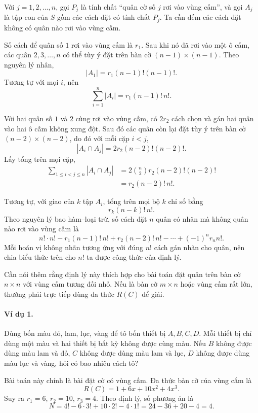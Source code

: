 \documentclass[11pt]{article}
\begin{document}
Với $j=1,2,\ldots,n$, gọi $P_j$ là tính chất ``quân cờ số $j$ rơi vào vùng
cấm'', và gọi $A_j$ là tập con của $S$ gồm các cách đặt có tính chất $P_j$.
Ta cần đếm các cách đặt không có quân nào rơi vào vùng cấm.

Số cách để quân số $1$ rơi vào vùng cấm là $r_1$. Sau khi nó đã rơi vào một ô
cấm, các quân $2,3,\ldots,n$ có thể tùy ý đặt trên bàn cờ
$(n-1)\times(n-1)$. Theo nguyên lý nhân,
\[
  |A_1| = r_1 (n-1)!(n-1)!.
\]
Tương tự với mọi $i$, nên
\[
  \sum_{i=1}^{n}|A_i| = r_1(n-1)!\,n!.
\]

Với hai quân số $1$ và $2$ cùng rơi vào vùng cấm, có $2r_2$ cách chọn và gán
hai quân vào hai ô cấm không xung đột. Sau đó các quân còn lại đặt tùy ý trên
bàn cờ $(n-2)\times(n-2)$, do đó với mỗi cặp $i<j$,
\[
  |A_i\cap A_j|=2r_2(n-2)!(n-2)!.
\]
Lấy tổng trên mọi cặp,
\[
\begin{aligned}
  \sum_{1\le i<j\le n}|A_i\cap A_j|
    &= 2\binom{n}{2}r_2(n-2)!(n-2)!\\
    &= r_2(n-2)!\,n!.
\end{aligned}
\]

Tương tự, với giao của $k$ tập $A_i$, tổng trên mọi bộ $k$ chỉ số bằng
\[
  r_k(n-k)!\,n!.
\]
Theo nguyên lý bao hàm--loại trừ, số cách đặt $n$ quân có nhãn mà không quân
nào rơi vào vùng cấm là
\[
  n!\cdot n!-r_1(n-1)!\,n!+r_2(n-2)!\,n!-\cdots+(-1)^nr_n n!.
\]
Mỗi hoán vị không nhãn tương ứng với đúng $n!$ cách gán nhãn cho quân, nên
chia biểu thức trên cho $n!$ ta được công thức của định lý.

Cần nói thêm rằng định lý này thích hợp cho bài toán đặt quân trên bàn cờ
$n\times n$ với vùng cấm tương đối nhỏ. Nếu là bàn cờ $m\times n$ hoặc vùng
cấm rất lớn, thường phải trực tiếp dùng đa thức $R(C)$ để giải.

\paragraph{Ví dụ 1.}
Dùng bốn màu đỏ, lam, lục, vàng để tô bốn thiết bị $A,B,C,D$. Mỗi thiết bị chỉ
dùng một màu và hai thiết bị bất kỳ không được cùng màu. Nếu $B$ không được
dùng màu lam và đỏ, $C$ không được dùng màu lam và lục, $D$ không được dùng
màu lục và vàng, hỏi có bao nhiêu cách tô?

Bài toán này chính là bài đặt cờ có vùng cấm. Đa thức bàn cờ của vùng cấm là
\[
  R(C)=1+6x+10x^2+4x^3.
\]
Suy ra $r_1=6$, $r_2=10$, $r_3=4$. Theo định lý, số phương án là
\[
  N=4!-6\cdot3!+10\cdot2!-4\cdot1!
   =24-36+20-4=4.
\]
\end{document}
